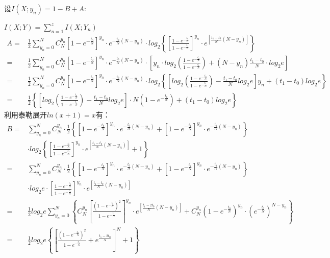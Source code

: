 \documentclass[12pt]{article}
\begin{document}
设$I(X;y_n)=1-B+A$:\par
$I(X;Y)=\sum\limits_{n=1}^zI(X;Y_n)$
\begin{equation*}
    \begin{aligned}
       A=&\frac{1}{2}\sum\limits_{y_n=0}^NC_N^{y_n}\left[1-e^{-\frac{t_0}{N}}\right]^{y_n}·e^{-\frac{t_0}{N}(N-y_n)}·log_2\left\{\left[\frac{1-e^{-\frac{t_0}{N}}}{1-e^{-\frac{t_1}{N}}}\right]^{y_n}·e^{[\frac{t_1-t_0}{N}(N-y_n)]}\right\} \\
       =&\frac{1}{2}\sum\limits_{y_n=0}^NC_N^{y_n}\left[1-e^{-\frac{t_0}{N}}\right]^{y_n}·e^{-\frac{t_0}{N}(N-y_n)}·\left[y_n·log_2\left(\frac{1-e^{-\frac{t_0}{N}}}{1-e^{-\frac{t_1}{N}}}\right)+(N-y_n)\frac{t_1-t_0}{N}·log_2e\right] \\
       =&\frac{1}{2}\sum\limits_{y_n=0}^NC_N^{y_n}\left[1-e^{-\frac{t_0}{N}}\right]^{y_n}·e^{-\frac{t_0}{N}(N-y_n)}·log_2\left\{\left[log_2\left(\frac{1-e^{-\frac{t_0}{N}}}{1-e^{-\frac{t_1}{N}}}\right)-\frac{t_1-t_0}{N}log_2e\right]y_n+(t_1-t_0)log_2e\right\} \\
       =&\frac{1}{2}\left\{\left[log_2\left(\frac{1-e^{-\frac{t_0}{N}}}{1-e^{-\frac{t_1}{N}}}\right)-\frac{t_1-t_0}{N}log_2e\right]·N\left(1-e^{-\frac{t_0}{N}}\right)+(t_1-t_0)log_2e\right\}
    \end{aligned}
\end{equation*}
利用泰勒展开$ln(x+1)=x$有：
\begin{equation*}
    \begin{aligned}
       B=&\sum\limits_{y_n=0}^NC_N^{y_n}·\frac{1}{2}\left\{\left[1-e^{-\frac{t_0}{N}}\right]^{y_n}·e^{-\frac{t_0}{N}(N-y_n)}+\left[1-e^{-\frac{t_1}{N}}\right]^{y_n}·e^{-\frac{t_1}{N}(N-y_n)}\right\} \\
       &·log_2\left\{\left[\frac{1-e^{-\frac{t_0}{N}}}{1-e^{-\frac{t_1}{N}}}\right]^{y_n}·e^{[\frac{t_1-t_0}{N}(N-y_n)]}+1\right\} \\
       =&\sum\limits_{y_n=0}^NC_N^{y_n}·\frac{1}{2}\left\{\left[1-e^{-\frac{t_0}{N}}\right]^{y_n}·e^{-\frac{t_0}{N}(N-y_n)}+\left[1-e^{-\frac{t_1}{N}}\right]^{y_n}·e^{-\frac{t_1}{N}(N-y_n)}\right\} \\
       &·log_2e·\left[\frac{1-e^{-\frac{t_0}{N}}}{1-e^{-\frac{t_1}{N}}}\right]^{y_n}·e^{[\frac{t_1-t_0}{N}(N-y_n)]} \\
       =&\frac{1}{2}log_2e\sum\limits_{y_n=0}^N\left\{C_N^{y_n}\left[\frac{(1-e^{-\frac{t_0}{N}})^2}{1-e^{-\frac{t_1}{N}}}\right]^{y_n}·e^{[\frac{t_1-2t_0}{N}(N-y_n)]}+C_N^{y_n}\left(1-e^{-\frac{t_0}{N}}\right)^{y_n}·\left(e^{-\frac{t_0}{N}}\right)^{N-y_n}\right\} \\
       =&\frac{1}{2}log_2e\left\{\left[\frac{(1-e^{-\frac{t_0}{N}})^2}{1-e^{-\frac{t_1}{N}}}+e^{\frac{t_1-2t_0}{N}}\right]^N+1\right\}
    \end{aligned}
\end{equation*}
\end{document}
